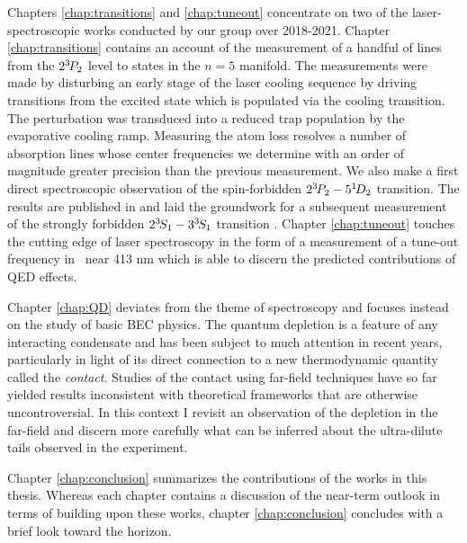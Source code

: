 	Chapters \ref{chap:transitions} and \ref{chap:tuneout} concentrate on two of the laser-spectroscopic works conducted by our group over 2018-2021.
	Chapter \ref{chap:transitions} contains an account of the measurement of a handful of lines from the $2^{3\!} P_2$ level to states in the $n=5$ manifold. 
	The measurements were made by disturbing an early stage of the laser cooling sequence by driving transitions from the excited state which is populated via the cooling transition. 
	The perturbation was transduced into a reduced trap population by the evaporative cooling ramp. 
	Measuring the atom loss resolves a number of absorption lines whose center frequencies we determine with an order of magnitude greater precision than the previous measurement. We also make a first direct spectroscopic observation of the spin-forbidden $2^{3\!} P_2 - 5^{1\!} D_2$ transition. The results are published in \cite{Ross20} and laid the groundwork for a subsequent measurement of the strongly forbidden $2^{3\!} S_1 - 3 ^{3\!} S_1$ transition \cite{Thomas20}.
	Chapter \ref{chap:tuneout} touches the cutting edge of laser spectroscopy in the form of a measurement of a tune-out frequency in \mhe~near 413 nm which is able to discern the predicted contributions of QED effects. 
	
	Chapter \ref{chap:QD} deviates from the theme of spectroscopy and focuses instead on the study of basic BEC physics. The quantum depletion is a feature of any interacting condensate and has been subject to much attention in recent years, particularly in light of its direct connection to a new thermodynamic quantity called the \emph{contact}. Studies of the contact using far-field techniques have so far yielded results inconsistent with theoretical frameworks that are otherwise uncontroversial. In this context I revisit an observation of the depletion in the far-field and discern more carefully what can be inferred about the ultra-dilute tails observed in the experiment. 

	Chapter \ref{chap:conclusion} summarizes the contributions of the works in this thesis. Whereas each chapter contains a discussion of the near-term outlook in terms of building upon these works, chapter \ref{chap:conclusion} concludes with a brief look toward the horizon.

